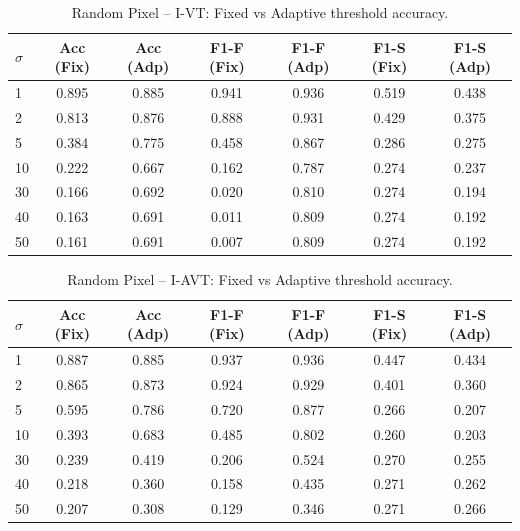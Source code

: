 \begin{table}[htb]
\centering
\caption{Random Pixel – I-VT: Fixed vs Adaptive threshold accuracy.}
\label{tab:random_pixel_ivt}
\begin{tabular}{lcccccc}
\toprule
$\sigma$ & Acc (Fix) & Acc (Adp) & F1-F (Fix) & F1-F (Adp) & F1-S (Fix) & F1-S (Adp) \\
\midrule
1 & 0.895 & 0.885 & 0.941 & 0.936 & 0.519 & 0.438 \\
2 & 0.813 & 0.876 & 0.888 & 0.931 & 0.429 & 0.375 \\
5 & 0.384 & 0.775 & 0.458 & 0.867 & 0.286 & 0.275 \\
10 & 0.222 & 0.667 & 0.162 & 0.787 & 0.274 & 0.237 \\
30 & 0.166 & 0.692 & 0.020 & 0.810 & 0.274 & 0.194 \\
40 & 0.163 & 0.691 & 0.011 & 0.809 & 0.274 & 0.192 \\
50 & 0.161 & 0.691 & 0.007 & 0.809 & 0.274 & 0.192 \\
\bottomrule
\end{tabular}
\end{table}


\begin{table}[htb]
\centering
\caption{Random Pixel – I-AVT: Fixed vs Adaptive threshold accuracy.}
\label{tab:random_pixel_iavt}
\begin{tabular}{lcccccc}
\toprule
$\sigma$ & Acc (Fix) & Acc (Adp) & F1-F (Fix) & F1-F (Adp) & F1-S (Fix) & F1-S (Adp) \\
\midrule
1 & 0.887 & 0.885 & 0.937 & 0.936 & 0.447 & 0.434 \\
2 & 0.865 & 0.873 & 0.924 & 0.929 & 0.401 & 0.360 \\
5 & 0.595 & 0.786 & 0.720 & 0.877 & 0.266 & 0.207 \\
10 & 0.393 & 0.683 & 0.485 & 0.802 & 0.260 & 0.203 \\
30 & 0.239 & 0.419 & 0.206 & 0.524 & 0.270 & 0.255 \\
40 & 0.218 & 0.360 & 0.158 & 0.435 & 0.271 & 0.262 \\
50 & 0.207 & 0.308 & 0.129 & 0.346 & 0.271 & 0.266 \\
\bottomrule
\end{tabular}
\end{table}


